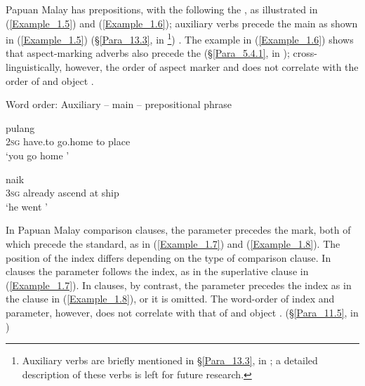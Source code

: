 Papuan Malay has prepositions, with the  following the , as illustrated in (\ref{Example_1.5}) and (\ref{Example_1.6}); auxiliary verbs precede the main  as shown in (\ref{Example_1.5}) (§\ref{Para_13.3}, in \footnote{Auxiliary verbs are briefly mentioned in §\ref{Para_13.3}, in ; a detailed description of these verbs is left for future research.})  \citep[see also][373–379]{Donohue.2007}. The example in (\ref{Example_1.6}) shows that aspect-marking adverbs also precede the  (§\ref{Para_5.4.1}, in ); cross-linguistically, however, the order of aspect marker and  does not correlate with the order of  and object \citep[130]{Dryer.2007}.



\begin{styleExampleTitle}
{Word order: Auxiliary  – main  – prepositional phrase}
\end{styleExampleTitle}
\ea
\label{Example_1.5}
 {} {pulang} {} {}\\ %
  \textsc{2sg} have.to  go.home to place\\

\glt 
‘you  go home ’ \textstyleExampleSource{[080922-010a-CvNF.0143]}
\z

\ea
\label{Example_1.6}
 {} {naik} {} {}\\ %
 \textsc{3sg} already ascend at ship\\


\glt 
‘he  went ’ \textstyleExampleSource{[080923-015-CvEx.0025]}
\z


In Papuan Malay comparison clauses, the parameter precedes the mark, both of which precede the standard, as in (\ref{Example_1.7}) and (\ref{Example_1.8}). The position of the index differs depending on the type of comparison clause. In  clauses the parameter follows the index, as in the superlative clause in (\ref{Example_1.7}). In  clauses, by contrast, the parameter precedes the index as in the  clause in (\ref{Example_1.8}), or it is omitted. The word-order of index and parameter, however, does not correlate with that of  and object \citep[130]{Dryer.2007}. (§\ref{Para_11.5}, in )



